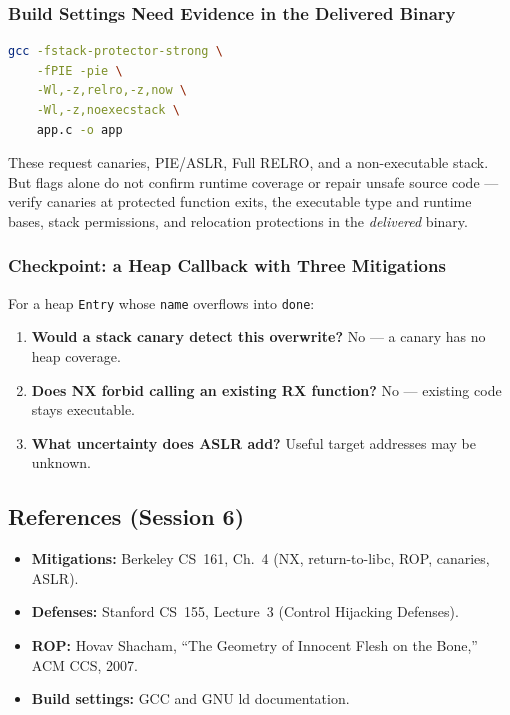\documentclass[hidelinks]{article}
\begin{document}
\subsubsection{Build Settings Need Evidence in the Delivered Binary}

\begin{lstlisting}[language=bash]
gcc -fstack-protector-strong \
    -fPIE -pie \
    -Wl,-z,relro,-z,now \
    -Wl,-z,noexecstack \
    app.c -o app
\end{lstlisting}
These request canaries, PIE/ASLR, Full RELRO, and a non-executable stack. But flags alone do not confirm runtime coverage or repair unsafe source code --- verify canaries at protected function exits, the executable type and runtime bases, stack permissions, and relocation protections in the \emph{delivered} binary.

\subsubsection{Checkpoint: a Heap Callback with Three Mitigations}

For a heap \texttt{Entry} whose \texttt{name} overflows into \texttt{done}:
\begin{enumerate}
    \item \textbf{Would a stack canary detect this overwrite?} No --- a canary has no heap coverage.
    \item \textbf{Does NX forbid calling an existing RX function?} No --- existing code stays executable.
    \item \textbf{What uncertainty does ASLR add?} Useful target addresses may be unknown.
\end{enumerate}

\subsection{References (Session 6)}

\begin{itemize}
    \item \textbf{Mitigations:} Berkeley CS~161, Ch.~4 (NX, return-to-libc, ROP, canaries, ASLR).
    \item \textbf{Defenses:} Stanford CS~155, Lecture~3 (Control Hijacking Defenses).
    \item \textbf{ROP:} Hovav Shacham, ``The Geometry of Innocent Flesh on the Bone,'' ACM CCS, 2007.
    \item \textbf{Build settings:} GCC and GNU ld documentation.
\end{itemize}
\end{document}
